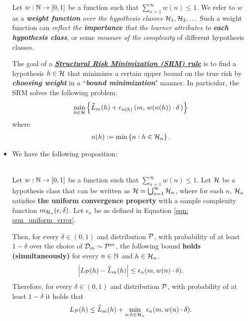 \documentclass[11pt]{article}
\begin{document}
\begin{itemize}
\begin{definition}
Let $w : {\mathbb N} \to [0,1]$ be a function such that $\sum_{n=1}^{\infty}w(n) \le 1$. We refer to $w$ as a \emph{\textbf{weight function} over the hypothesis classes} ${\mathcal H}_1, {\mathcal H}_2, \ldots$ Such a weight function can \emph{reflect the \textbf{importance} that the learner attributes to \textbf{each hypothesis class}}, or some \emph{measure of the} \emph{complexity} of different hypothesis classes.

The goal of a \underline{\emph{\textbf{Structural Risk Minimization (SRM) rule}}} is to find a hypothesis $h \in {\mathcal H}$ that minimizes a certain upper bound on the true risk by \emph{\textbf{choosing weight}} in a ``\emph{\textbf{bound minimization}}" manner. In particular, the SRM solves the following problem:
\begin{align}
\min_{h \in {\mathcal H}}\left\{\widehat{L}_{m}(h) + \epsilon_{n(h)}\left(m, \,w(n(h)) \cdot \delta \,\right)\right\}  \label{eqn: srm_objective}
\end{align} where 
\begin{align}
n(h) := \min\left\{n : h \in {\mathcal H}_n\right\}.  \label{eqn: srm_index_assign}
\end{align}
\end{definition}

\item We have the following proposition:
\begin{proposition} \citep{shalev2014understanding}\\
Let $w : {\mathbb N} \to [0,1]$ be a function such that $\sum_{n=1}^{\infty}w(n) \le 1$. Let ${\mathcal H}$ be a hypothesis class that can be written as ${\mathcal H} = \bigcup_{n = 1}^{\infty}{\mathcal H}_n$, where for each $n$, ${\mathcal H}_n$ satisfies \textbf{the uniform convergence property} with a sample complexity function $m_{{\mathcal H}_n}(\epsilon, \delta)$. Let $\epsilon_n$ be as defined in Equation \ref{eqn: srm_uniform_error}. 

Then, for every $\delta \in (0,1)$ and distribution ${\mathcal P}$, with probability of at least $1- \delta$ over the choice of ${\mathcal D}_m \sim {\mathcal P}^m$, the following bound \textbf{holds (simultaneously)} for every $n \in {\mathbb N}$ and $h \in {\mathcal H}_n$. 
\begin{align*}
\left\lvert L_{{\mathcal P}}(h) - \widehat{L}_{m}(h) \right\rvert \le \epsilon_n(m, w(n) \cdot \delta).
\end{align*}
Therefore, for every $\delta \in (0,1)$ and distribution  ${\mathcal P}$, with probability of at least $1- \delta$ it
holds that
\begin{align}
L_{{\mathcal P}}(h) \le \widehat{L}_{m}(h) + \min_{n: h \in {\mathcal H}_n}\epsilon_n(m, w(n) \cdot \delta). \label{eqn: srm_uniform_generalization_bound}
\end{align}
\end{proposition}


\end{itemize}
\end{document}

